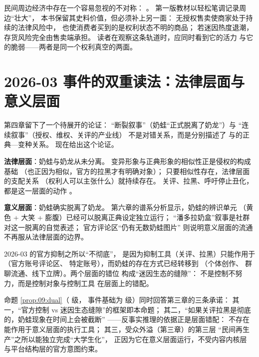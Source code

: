 \begin{nlcritique}
  民间周边经济中存在一个容易忽视的不对称：
  。
  第一版教材以轻松笔调记录周边“壮大”，
  本书保留其史料价值，但必须补上另一面：
  无授权售卖使商家处于持续的法律风险中，
  也使消费者买到的是权利状态不明的商品；
  若迷因热度退潮，存货风险完全由售卖端承担。
  读者在观察这条轨道时，应同时看到它的活力
  与它的脆弱——两者是同一个权利真空的两面。
\end{nlcritique}

\section{2026-03 事件的双重读法：法律层面与意义层面}\label{sec:09:split}

第四章留下了一个待展开的论证：
“断裂叙事”（奶蛙“正式脱离了奶龙”）与
“连续叙事”（授权、维权、关评的产业线）
不是对错关系，而是分别描述了
与的正典—变种关系。
现在给出这个论证。

\textbf{法律层面}：奶蛙与奶龙从未分离。
变异形象与正典形象的相似性正是侵权的构成基础
（也正因为相似，官方的拉黑才有明确对象）；
只要相似性存在，法律层面的支配关系
（权利人可以主张什么）就持续存在。
关评、拉黑、呼吁停止丑化，都是这一层面的动作
\cite{shoutanji2026naiwa}。

\textbf{意义层面}：奶蛙确实脱离了奶龙。
第六章的谱系分析显示，奶蛙的辨识单元
（黄色 + 大笑 + 膨腹）已经可以脱离正典设定独立运行；
“潘多拉奶盒”叙事是社群对这一脱离的自觉表述；
官方评论区“仍有无数奶蛙图片”
\cite{shoutanji2026naiwa}
则说明意义层面的流通不再服从法律层面的边界。

\begin{proposition}\label{prop:09:dual}
  2026-03 的官方抑制之所以“不彻底”，
  是因为抑制工具（关评、拉黑）只能作用于
  （官方账号评论区、
  特定账号），而奶蛙的存在方式已经转移到
  （个体创作、
  群聊流通、线下立牌）。两个层面的错位
  构成“迷因生态的缝隙”：
  不是控制不努力，而是控制对象与控制工具
  在层面上的错配。
\end{proposition}

命题 \ref{prop:09:dual}（ 级，
事件基础为  级）同时回答第三章的三条承诺：
其一，“官方控制 vs 迷因生态缝隙”的框架即本命题；
其二，“如果关评拉黑是彻底的，奶蛙现象在时间上会被截断”
——反事实推理的依据正是层面错配：
不存在能作用于意义层面的执行工具；
其三，受众外溢（第三章）的第三层
“民间再生产”之所以能独立完成“大学生化”，
正因为它在意义层面运行，不受内容内核层
与平台结构层的官方意图约束。

